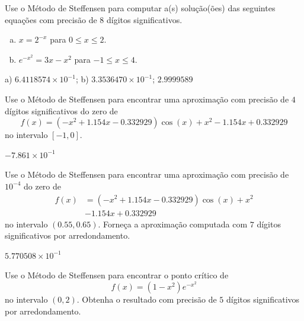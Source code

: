 \begin{exer}
  Use o Método de Steffensen para computar a(s) solução(ões) das seguintes equações com precisão de 8 dígitos significativos.
  \begin{enumerate}[a)]
  \item $x = 2^{-x}$ para $0\leq x \leq 2$.
  \item $e^{-x^2} = 3x - x^2$ para $-1\leq x\leq 4$.
  \end{enumerate}
\end{exer}
\begin{resp}
  a) $6.4118574\times 10^{-1}$; b) $3.3536470\times 10^{-1}$; $2.9999589$
\end{resp}

\begin{exer}
  Use o Método de Steffensen para encontrar uma aproximação com precisão de $4$ dígitos significativos do zero de 
  \begin{equation}
    f(x) = (-x^2+1.154x-0.332929)\cos(x) + x^2 - 1.154x + 0.332929
  \end{equation}
  no intervalo $[-1, 0]$.
\end{exer}
\begin{resp}
  $-7.861\times 10^{-1}$
\end{resp}

\begin{exer}
  Use o Método de Steffensen para encontrar uma aproximação com precisão de $10^{-4}$ do zero de
  \begin{equation}
    \begin{aligned}
      f(x) &= (-x^2+1.154x-0.332929)\cos(x) + x^2 \\
      &- 1.154x + 0.332929
  \end{aligned}
  \end{equation}
no intervalo $(0.55, 0.65)$. Forneça a aproximação computada com $7$ dígitos significativos por arredondamento.
\end{exer}
\begin{resp}
  $5.770508\times 10^{-1}$
\end{resp}

\begin{exer}
  Use o Método de Steffensen para encontrar o ponto crítico de
  \begin{equation}
    f(x) = (1-x^2)e^{-x^2}
  \end{equation}
  no intervalo $(0, 2)$. Obtenha o resultado com precisão de $5$ dígitos significativos por arredondamento.
\end{exer}

